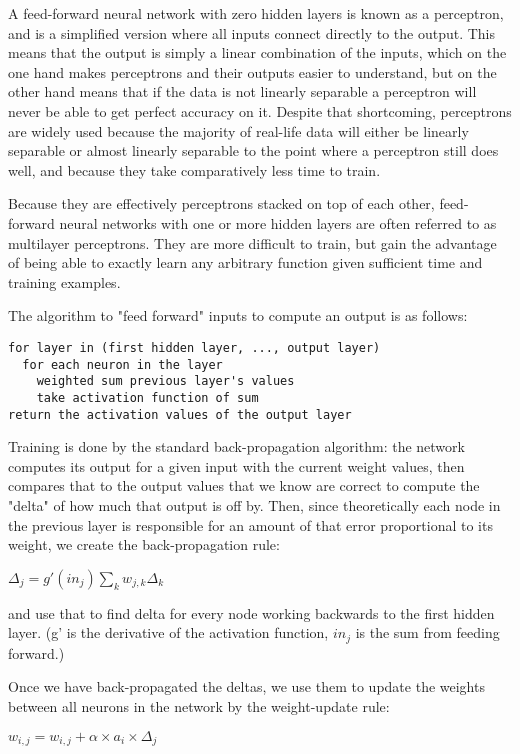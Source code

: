 \documentclass[11pt]{article} %
\begin{document}
A feed-forward neural network with zero hidden layers is known as a perceptron, and is a simplified version where all inputs connect directly to the output. This means that the output is simply a linear combination of the inputs, which on the one hand makes perceptrons and their outputs easier to understand, but on the other hand means that if the data is not linearly separable a perceptron will never be able to get perfect accuracy on it. Despite that shortcoming, perceptrons are widely used because the majority of real-life data will either be linearly separable or almost linearly separable to the point where a perceptron still does well, and because they take comparatively less time to train.

Because they are effectively perceptrons stacked on top of each other, feed-forward neural networks with one or more hidden layers are often referred to as multilayer perceptrons. They are more difficult to train, but gain the advantage of being able to exactly learn any arbitrary function given sufficient time and training examples.

The algorithm to "feed forward" inputs to compute an output is as follows:

\begin{verbatim}
for layer in (first hidden layer, ..., output layer)
  for each neuron in the layer
    weighted sum previous layer's values
    take activation function of sum
return the activation values of the output layer
\end{verbatim}

Training is done by the standard back-propagation algorithm: the network computes its output for a given input with the current weight values, then compares that to the output values that we know are correct to compute the "delta" of how much that output is off by. Then, since theoretically each node in the previous layer is responsible for an amount of that error proportional to its weight, we create the back-propagation rule:

$\Delta_j = g'(in_j)\sum_k w_{j,k}\Delta_k$

and use that to find delta for every node working backwards to the first hidden layer. (g' is the derivative of the activation function, $in_j$ is the sum from feeding forward.)

Once we have back-propagated the deltas, we use them to update the weights between all neurons in the network by the weight-update rule:

$w_{i,j} = w_{i,j} + \alpha \times a_i \times \Delta_j$
\end{document}

